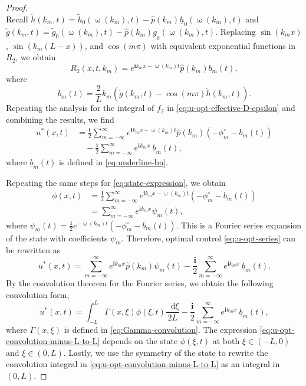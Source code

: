 \documentclass[journal,twoside,web]{ieeecolor}
\newcommand{\state}{\phi}
\newcommand{\im}{\mathbf{i}}
\newcommand*\diff{\mathop{}\!\mathrm{d}}
\newcommand{\wcomplex}{\upomega}
\begin{document}
\begin{proof}
$$$$
Recall $\check{h}(k_m,t) = \tilde{h}_0(\wcomplex(k_m),t)  - \hat{p}(k_m)\underline{h}_0(\wcomplex(k_m),t)$ and $\check{g}(k_m,t) = \tilde{g}_0(\wcomplex(k_m),t) - \hat{p}(k_m)\underline{g}_0(\wcomplex(k_m),t)$.
Replacing $\sin(k_mx)$, $\sin(k_m(L-x))$, and $\cos(m\pi)$ with equivalent exponential functions in $R_2$, we obtain
	$$R_2(x,t,k_m)  = e^{\im k_m x-\wcomplex(k_m)t}\hat{p}(k_m)b_m(t),$$
	where
	$$
	b_m(t)  = \dfrac{2}{L}k_m(\check{g}(k_m,t)-\cos(m\pi)\check{h}(k_m,t)).
	$$
Repeating the analysis for the integral of $f_2$ in \eqref{eq:u-opt-effective-D-epsilon} and combining the results, we find
\begin{equation}\label{eq:u-opt-series}
	\begin{aligned}
		u^*(x,t) &=\frac{\im}{2} \sum_{m=-\infty}^{\infty}e^{\im k_m x-\wcomplex(k_m)t}\hat{p}(k_m)(-\state_m^\circ - b_m(t)) \\
		& \quad - \frac{\im}{2}\sum_{m=-\infty}^{\infty}e^{\im k_m x}\ \underline{b}_m(t),
	\end{aligned}
\end{equation}
where $\underline{b}_m(t)$ is defined in \eqref{eq:underline-bn}.

Repeating the same steps for \eqref{eq:state-expression}, we obtain
\begin{equation}\label{eq:state-expression-series}
	\begin{aligned}
		\state(x,t) &=\frac{\im}{2} \sum_{m=-\infty}^{\infty}e^{\im k_m x-\wcomplex(k_m)t}(-\state_m^\circ - b_m(t)) \\
		& = \sum_{m=-\infty}^{\infty}e^{\im k_m x}\psi_m(t),
	\end{aligned}
\end{equation}
where $\psi_m(t) = \frac{\im}{2}e^{-\wcomplex(k_m)t}(-\state_m^\circ - b_m(t))$.
This is a Fourier series expansion of the state with coefficients $\psi_m$.
Therefore, optimal control \eqref{eq:u-opt-series} can be rewritten as 
\begin{equation*}
		u^*(x,t) = \sum_{m=-\infty}^{\infty}e^{\im k_m x}\hat{p}(k_m)\psi_m(t) - \frac{\im}{2}\sum_{m=-\infty}^{\infty}e^{\im k_m x}\ \underline{b}_m(t).
\end{equation*}
By the convolution theorem for the Fourier series, we obtain the following convolution form,
\begin{equation}\label{eq:u-opt-convolution-minus-L-to-L}
	u^*(x,t)= \int_{-L}^{L} \Gamma(x,\xi)\state(\xi,t)\frac{\diff \xi}{2L}- \frac{\im}{2}\sum_{m=-\infty}^{\infty}e^{\im k_m x}\ \underline{b}_m(t),
\end{equation}
where $\Gamma(x,\xi)$ is defined in \eqref{eq:Gamma-convolution}.
The expression \eqref{eq:u-opt-convolution-minus-L-to-L} depends on the state $\state(\xi,t)$ at both $\xi\in(-L,0)$ and $\xi\in(0,L)$.
Lastly, we use the symmetry of the state to rewrite the convolution integral in \eqref{eq:u-opt-convolution-minus-L-to-L} as an integral in $(0,L)$.


\end{proof}
\end{document}
